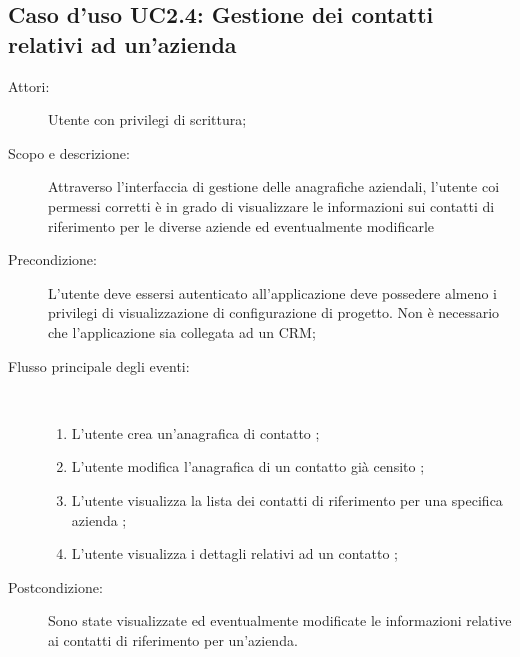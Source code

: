 \documentclass[12pt,a4paper,twoside,openright,english]{book}
\begin{document}
\subsection{Caso d'uso UC2.4: Gestione dei contatti relativi ad un'azienda}\begin{description}
	\item[Attori:] Utente con privilegi di scrittura;
	\item[Scopo e descrizione:] Attraverso l’interfaccia di gestione delle anagrafiche aziendali, l’utente coi permessi corretti è in grado di visualizzare le informazioni sui contatti di riferimento per le diverse aziende ed eventualmente modificarle
	\item[Precondizione:] L’utente deve essersi autenticato all’applicazione deve possedere almeno i privilegi di visualizzazione di configurazione di progetto. Non è necessario che l’applicazione sia collegata ad un CRM;
	
	\item[Flusso principale degli eventi:] \ 
	\begin{enumerate}
		\item L’utente crea un’anagrafica di contatto ;
		\item L’utente modifica l’anagrafica di un contatto già censito ;
		\item L’utente visualizza la lista dei contatti di riferimento per una specifica azienda ;
		\item L’utente visualizza i dettagli relativi ad un contatto ;
		
	\end{enumerate}
	\item[Postcondizione:] Sono state visualizzate ed eventualmente modificate le informazioni relative ai contatti di riferimento per un’azienda.
\end{description}

\hypertarget{UC3}{}
\end{document}
